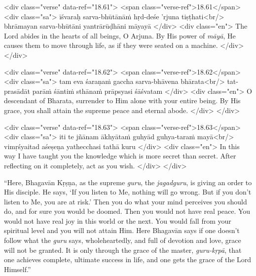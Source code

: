 \begin{html}
<div class="verse" data-ref="18.61">
  <span class="verse-ref">18.61</span>
  <div class="sa">
    īśvaraḥ sarva-bhūtānāṁ hṛd-deśe ’rjuna tiṣṭhati<br/>
    bhrāmayan sarva-bhūtāni yantrārūḍhāni māyayā
  </div>
  <div class="en">
    The Lord abides in the hearts of all beings, O Arjuna. By His power of \textit{māyā}, He causes them to move through life, as if they were seated on a machine.
  </div>
</div>
\end{html}



\begin{html}
<div class="verse" data-ref="18.62">
  <span class="verse-ref">18.62</span>
  <div class="sa">
    tam eva śaraṇaṁ gaccha sarva-bhāvena bhārata<br/>
    tat-prasādāt parāṁ śāntiṁ sthānaṁ prāpsyasi śāśvatam
  </div>
  <div class="en">
    O descendant of Bharata, surrender to Him alone with your entire being. By His grace, you shall attain the supreme peace and eternal abode.
  </div>
</div>
\end{html}



\begin{html}
<div class="verse" data-ref="18.63">
  <span class="verse-ref">18.63</span>
  <div class="sa">
    iti te jñānam ākhyātaṁ guhyād guhya-taraṁ mayā<br/>
    vimṛśyaitad aśeṣeṇa yathecchasi tathā kuru
  </div>
  <div class="en">
    In this way I have taught you the knowledge which is more secret than secret. After reflecting on it completely, act as you wish.
  </div>
</div>
\end{html}


\enquote{Here, Bhagavān Kṛṣṇa, as the supreme \textit{guru}, the \textit{jagadguru}, is giving an order to His disciple. He says, \enquote{If you listen to Me, nothing will go wrong. But if you don’t listen to Me, you are at risk.} Then you do what your mind perceives you should do, and for sure you would be doomed. Then you would not have real peace. You would not have real joy in this world or the next. You would fall from your spiritual level and you will not attain Him. Here Bhagavān says if one doesn’t follow what the \textit{guru} says, wholeheartedly, and full of devotion and love, grace will not be granted. It is only through the grace of the master, \textit{guru-kṛpā}, that one achieves complete, ultimate success in life, and one gets the grace of the Lord Himself.}

